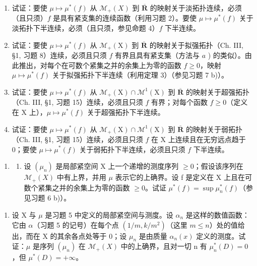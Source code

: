 \begin{enumerate}
\def\labelenumi{\alph{enumi})}
\item
  试证：要使 \(\mu \mapsto \mu^{*}(f)\) 从 \(\mathcal{M}_{+}(X)\) 到 \(\overline{\mathbf{R}}\) 的映射关于淡拓扑连续，必须（且只须）\(f\) 是具有紧支集的连续函数（利用习题 2）。要使 \(\mu \mapsto \mu^{*}(f)\) 关于淡拓扑下半连续，必须（且只须，参见命题 4）\(f\) 下半连续。
\item
  试证：要使 \(\mu \mapsto \mu^{*}(f)\) 从 \(\mathcal{M}_{+}(\mathrm{X})\) 到 \(\overline{\mathbf{R}}\) 的映射关于拟强拓扑（Ch. III, §1, 习题 8）连续，必须且只须 \(f\) 有界且具有紧支集（方法与 \(a\) ) 的类似）。由此推出，对每个在可数个紧集之并的余集上为零的函数 \(f \geqslant 0\)，映射 \(\mu \mapsto \mu^{*}(f)\) 关于拟强拓扑下半连续（利用定理 3）（参见习题 7 b)）。
\item
  试证：要使 \(\mu \mapsto \mu^{*}(f)\) 从 \(\mathcal{M}_{+}(\mathrm{X}) \cap \mathcal{M}^{1}(\mathrm{X})\) 到 \(\overline{\mathbf{R}}\) 的映射关于超强拓扑（Ch. III, §1, 习题 15）连续，必须且只须 \(f\) 有界；对每个函数 \(f \geqslant 0\)（定义在 \(\mathrm{X}\) 上），\(\mu \mapsto \mu^{*}(f)\) 关于超强拓扑下半连续。
\item
  试证：要使 \(\mu \mapsto \mu^{*}(f)\) 从 \(\mathcal{M}_{+}(\mathrm{X}) \cap \mathcal{M}^{1}(\mathrm{X})\) 到 \(\overline{\mathbf{R}}\) 的映射关于弱拓扑（Ch. III, §1, 习题 15）连续，必须且只须 \(f\) 在 \(\mathrm{X}\) 上连续且在无穷远点趋于 0；要使 \(\mu \mapsto \mu^{*}(f)\) 关于弱拓扑下半连续，必须且只须 \(f\) 下半连续。
\end{enumerate}

\begin{enumerate}
\def\labelenumi{\arabic{enumi})}
\setcounter{enumi}{6}
\tightlist
\item
  \begin{enumerate}
  \def\labelenumii{\alph{enumii})}
  \tightlist
  \item
    设 \((\mu_{n})\) 是局部紧空间 X 上一个递增的测度序列 \(\geqslant0\)；假设该序列在 \(\mathcal{M}_{+}(X)\) 中有上界，并用 \(\mu\) 表示它的上确界。设 f 是定义在 X 上且在可数个紧集之并的余集上为零的函数 \(\geqslant0\)。试证 \(\mu^{*}(f)=\sup\mu_{n}^{*}(f)\)（参见习题 6 b)）。
  \end{enumerate}
\end{enumerate}

\begin{enumerate}
\def\labelenumi{\alph{enumi})}
\setcounter{enumi}{1}
\tightlist
\item
  设 X 与 \(\mu\) 是习题 5 中定义的局部紧空间与测度。设 \(\alpha_{n}\) 是这样的数值函数：它由 \(\alpha\)（习题 5 的记号）在每个点 \((1/m, k/m^{2})\)（这里 \(m \leqslant n\)）处的值给出，而在 X 的其余各点处等于 0；设 \(\mu_{n}\) 是由质量 \(\alpha_{n}(x)\) 定义的测度。试证：\(\mu\) 是序列 \((\mu_{n})\) 在 \(\mathcal{M}_{+}(X)\) 中的上确界，且对一切 n 有 \(\mu_{n}^{*}(D)=0\)，但 \(\mu^{*}(D)=+\infty\)。
\end{enumerate}

